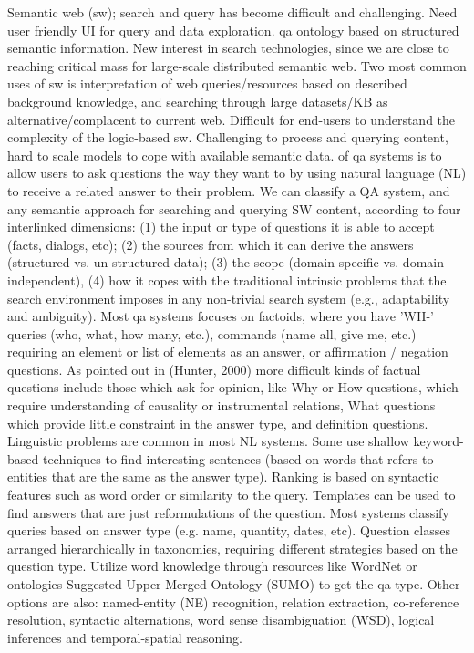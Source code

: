 Semantic web (sw); search and query has become difficult and challenging. Need user friendly UI for query and data exploration. qa ontology based on structured semantic information. New interest in search technologies, since we are close to reaching critical mass for large-scale distributed semantic web. Two most common uses of sw is interpretation of web queries/resources based on described background knowledge, and searching through large datasets/KB as alternative/complacent to current web. Difficult for end-users to understand the complexity of the logic-based sw. Challenging to process and querying content, hard to scale models to cope with available semantic data.
of qa systems is to allow users to ask questions the way they want to by using natural language (NL) to receive a related answer to their problem. We can classify a QA system, and any semantic approach for searching and querying SW content, according to four interlinked dimensions: 
(1)	the input or type of questions it is able to accept (facts, dialogs, etc); 
(2)	the sources from which it can derive the answers (structured vs. un-structured data); 
(3)	the scope (domain specific vs. domain independent), 
(4)	how it copes with the traditional intrinsic problems that the search environment imposes in any non-trivial search system (e.g., adaptability and ambiguity).
Most qa systems focuses on factoids, where you have 'WH-' queries (who, what, how many, etc.), commands (name all, give me, etc.) requiring an element or list of elements as an answer, or affirmation / negation questions. As pointed out in (Hunter, 2000) more difficult kinds of factual questions include those which ask for opinion, like Why or How questions, which require understanding of causality or instrumental relations, What questions which provide little constraint in the answer type, and definition questions. 
Linguistic problems are common in most NL systems. Some use shallow keyword-based techniques to find interesting sentences (based on words that refers to entities that are the same as the answer type). Ranking is based on syntactic features such as word order or similarity to the query. Templates can be used to find answers that are just reformulations of the question. Most systems classify queries based on answer type (e.g. name, quantity, dates, etc). Question classes arranged hierarchically in taxonomies, requiring different strategies based on the question type. Utilize word knowledge through resources like WordNet or ontologies Suggested Upper Merged Ontology (SUMO) to get the qa type. Other options are also: named-entity (NE) recognition, relation extraction, co-reference resolution, syntactic alternations, word sense disambiguation (WSD), logical inferences and temporal-spatial reasoning.
